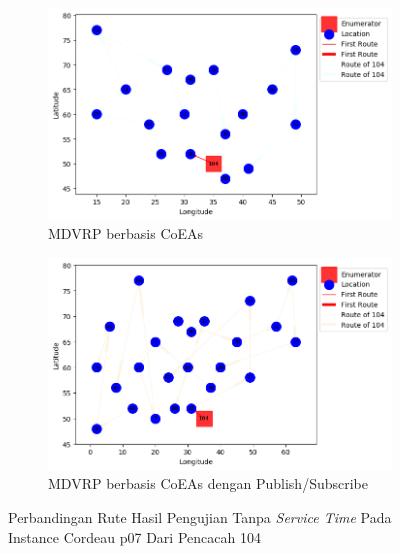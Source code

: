 \begin{figure}[H]
	\centering
	\begin{subfigure}[t]{\textwidth}
		\centering
		\includegraphics[width=\textwidth]{Resources/Images/cordeau_p07/cordeau_p07_notw_104_coes}
		\caption{MDVRP berbasis CoEAs}
		\label{fig:cordeau_p07_notw_104_coes}
	\end{subfigure}
	\begin{subfigure}[t]{\textwidth}
		\centering
		\includegraphics[width=\textwidth]{Resources/Images/cordeau_p07/cordeau_p07_notw_104_pubsub_coes}
		\caption{MDVRP berbasis CoEAs dengan Publish/Subscribe}
		\label{fig:cordeau_p07_notw_104_pubsub_coes}
	\end{subfigure}
	\caption{Perbandingan Rute Hasil Pengujian Tanpa \textit{Service Time} Pada Instance Cordeau p07 Dari Pencacah 104}
	\label{fig:cordeau_p07_notw_104}
\end{figure}


